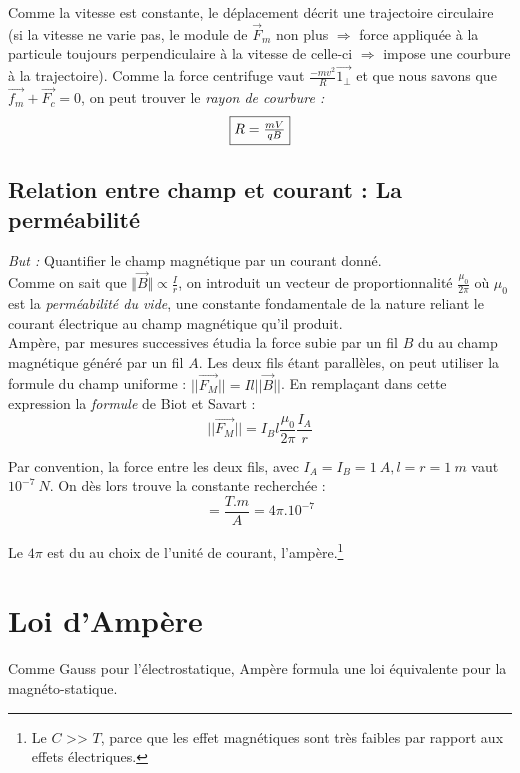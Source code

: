 \documentclass	[11pt, a4paper, openany]{book}
\begin{document}
Comme la vitesse est constante, le déplacement décrit une trajectoire circulaire (si la vitesse ne varie pas, le module de $\vec{F}_m$ non plus $\Rightarrow$ force appliquée à la particule toujours perpendiculaire à la vitesse de celle-ci $\Rightarrow$ impose une courbure à la trajectoire). Comme la force centrifuge vaut $\frac{-mv^2}{R}\vec{1_\perp}$ et que nous savons que $\vec{f_m} + \vec{F_c} = 0$, on peut trouver le \textit{rayon de courbure :}
\begin{equation}
	\fbox{$R = \frac{mV}{qB}$} 
\end{equation}


\subsection{Relation entre champ et courant : La perméabilité}
\textit{But :} Quantifier le champ magnétique par un courant donné.\\
Comme on sait que $\Vert \vec{B} \Vert \propto \frac{I}{r}$, on introduit un vecteur de proportionnalité $\frac{\mu_0}{2\pi}$ où $\mu_0$ est la \textit{perméabilité du vide}, une constante fondamentale de la nature reliant le courant électrique au champ magnétique qu'il produit.\\

Ampère, par mesures successives étudia la force subie par un fil $B$ du au champ magnétique généré par un fil $A$. Les deux fils étant parallèles, on peut utiliser la formule du champ uniforme : $||\vec{F_M}|| = I l ||\vec{B}||$. En remplaçant dans cette expression la \textit{formule} de Biot et Savart :
\begin{equation}
	||\vec{F_M}|| = I_Bl\frac{\mu_0}{2\pi}\frac{I_A}{r}
\end{equation}




Par convention, la force entre les deux fils, avec $I_A = I_B = 1\ A, l = r = 1\ m$ vaut $10^{-7}\ N$. On dès lors trouve la constante recherchée :
\begin{equation}
	[\mu_0] = \frac{T.m}{A} = 4\pi . 10^{-7}
\end{equation}

Le $4\pi$ est du au choix de l'unité de courant, l'ampère.\footnote{Le $C$ >> $T$, parce que les effet magnétiques sont très faibles par rapport aux effets électriques.}

\section{Loi d'Ampère}
Comme Gauss pour l'électrostatique, Ampère formula une loi équivalente pour la magnéto-statique.
\end{document}
